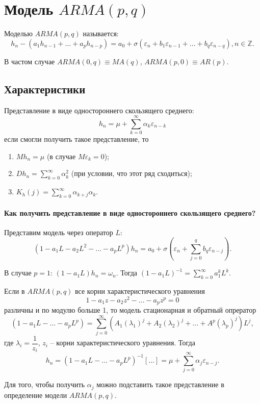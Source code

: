 \section{Модель $ARMA(p, q)$}

\begin{definition}
  Моделью $ARMA(p, q)$ называется:
  \[
    h_n - \left( a_1 h_{n-1} + \dots + a_p h_{n-p} \right) = a_0 + \sigma \left( \varepsilon_n + b_1 \varepsilon_{n-1} + \dots + b_q \varepsilon_{n-q} \right),
    n \in \mathbb{Z}.
  \]
\end{definition}


В частом случае $ARMA(0, q) \equiv MA(q)$, $ARMA(p, 0) \equiv AR(p)$.

\subsection{Характеристики}

Представление в виде одностороннего скользящего среднего:
\[
  h_n = \mu + \sum_{k=0}^\infty \alpha_k \varepsilon_{n-k}
\]
если смогли получить такое представление, то
\begin{enumerate}
  \item $Mh_n = \mu$ (в случае $M\varepsilon_k = 0$);
  \item $Dh_n = \sum_{k=0}^\infty \alpha_k^2$ (при условии, что этот ряд сходиться);
  \item $K_h(j) = \sum_{k=0}^\infty \alpha_{k+j} \alpha_k$.
\end{enumerate}

\paragraph{Как получить представление в виде одностороннего скользящего среднего?}
Представим модель через оператор $L$:
\[
  \left( 1 - a_1 L - a_2 L^2 - \dots - a_p L^p \right) h_n = a_0 + \sigma \left( \varepsilon_n + \sum_{j=0}^q b_q \varepsilon_{n-j} \right).
\]

В случае $p = 1$: $(1 - a_1 L) h_n = \omega_n$. Тогда
$(1 - a_1 L)^{-1} = \sum_{k=0}^\infty a_1^k L^k$.

\begin{theorem}
  Если в $ARMA(p, q)$ все корни характеристического уравнения
  \[
    1 - a_1 z - a_2 z^2 - \dots - a_p z^p = 0
  \]
  различны и по модулю больше 1, то модель стационарная и обратный опрератор
  \[
    (1 - a_1 L - \dots - a_p L^p) = \sum_{j=0}^\infty \left( A_1 (\lambda_1)^j + A_2 (\lambda_2)^j + \dots + A^p (\lambda_p)^j \right) L^j,
  \]
  где $\lambda_i = \dfrac{1}{z_i}$, $z_i$ -- корни характеристического уравнения. 
  Тогда
  \[
    h_n = \left( 1 - a_1 L - \dots - a_p L^p \right)^{-1} \left[ \dots \right]
    = \mu + \sum_{j=0}^\infty \alpha_j \varepsilon_{n-j}.
  \]
\end{theorem}
Для того, чтобы получить $\alpha_j$ можно подставить такое представление в определение модели $ARMA(p, q)$.


